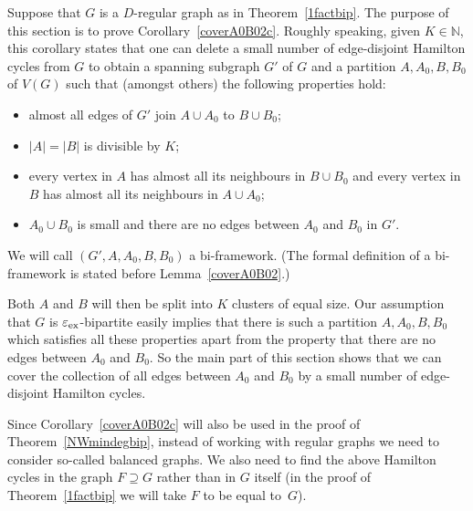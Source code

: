 \documentclass{memo-l}
\def\COMMENT#1{}
\def\eps{\varepsilon}
\numberwithin{section}{chapter}
\numberwithin{equation}{section}
\numberwithin{firstthm}{section}
\numberwithin{figure}{section}
\begin{document}
{Suppose that $G$ is a $D$-regular graph as in Theorem~\ref{1factbip}. 
The purpose of this section is to prove Corollary~\ref{coverA0B02c}.
Roughly speaking, given $K\in \mathbb{N}$, this corollary states that one can delete a small number of edge-disjoint Hamilton cycles from $G$
to obtain a spanning subgraph $G'$ of $G$ and a partition $A,A_0,B,B_0$ of $V(G)$ such that (amongst others) the following properties hold:
\begin{itemize}
\item almost all edges of $G'$ join $A\cup A_0$ to $B\cup B_0$;
\item $|A|=|B|$ is divisible by $K$;
\item every vertex in $A$ has almost all its neighbours in $B\cup B_0$ and every vertex in $B$ has almost all its neighbours in $A\cup A_0$;
\item $A_0\cup B_0$ is small and there are no edges between $A_0$ and
$B_0$ in $G'$.
\end{itemize}
We will call $(G',A,A_0,B,B_0)$ a bi-framework.
(The formal definition of a bi-framework is stated before Lemma~\ref{coverA0B02}.)%
\COMMENT{AL: added this sentense}
Both $A$ and $B$ will then be split into $K$ clusters of equal size.
Our assumption that $G$ is $\eps_{\rm ex}$-bipartite easily implies that there is such a partition $A,A_0,B,B_0$
which satisfies all these properties apart from the property that there are no edges
between $A_0$ and $B_0$.
So the main part of this section shows that we can cover the collection of all  edges 
between $A_0$ and $B_0$ by a small number of edge-disjoint
Hamilton cycles.

Since Corollary~\ref{coverA0B02c} will also be used in the proof of Theorem~\ref{NWmindegbip}, instead of working with regular
graphs we need to consider so-called balanced graphs. We also need to find the above Hamilton cycles in the graph $F\supseteq G$ rather than
in $G$ itself (in the proof of Theorem~\ref{1factbip} we will take $F$ to be equal to~$G$).
 
}
\end{document}
